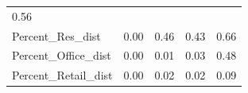 \documentclass[]{article}
\begin{document}
\begin{longtable}[]{@{}lllll@{}}
\begin{minipage}[t]{0.11\columnwidth}
0.56\strut
\end{minipage}\tabularnewline
\begin{minipage}[t]{0.49\columnwidth}\raggedright\strut
Percent\_Res\_dist\strut
\end{minipage} & \begin{minipage}[t]{0.08\columnwidth}\raggedright\strut
0.00\strut
\end{minipage} & \begin{minipage}[t]{0.09\columnwidth}\raggedright\strut
0.46\strut
\end{minipage} & \begin{minipage}[t]{0.09\columnwidth}\raggedright\strut
0.43\strut
\end{minipage} & \begin{minipage}[t]{0.11\columnwidth}\raggedright\strut
0.66\strut
\end{minipage}\tabularnewline
\begin{minipage}[t]{0.49\columnwidth}\raggedright\strut
Percent\_Office\_dist\strut
\end{minipage} & \begin{minipage}[t]{0.08\columnwidth}\raggedright\strut
0.00\strut
\end{minipage} & \begin{minipage}[t]{0.09\columnwidth}\raggedright\strut
0.01\strut
\end{minipage} & \begin{minipage}[t]{0.09\columnwidth}\raggedright\strut
0.03\strut
\end{minipage} & \begin{minipage}[t]{0.11\columnwidth}\raggedright\strut
0.48\strut
\end{minipage}\tabularnewline
\begin{minipage}[t]{0.49\columnwidth}\raggedright\strut
Percent\_Retail\_dist\strut
\end{minipage} & \begin{minipage}[t]{0.08\columnwidth}\raggedright\strut
0.00\strut
\end{minipage} & \begin{minipage}[t]{0.09\columnwidth}\raggedright\strut
0.02\strut
\end{minipage} & \begin{minipage}[t]{0.09\columnwidth}\raggedright\strut
0.02\strut
\end{minipage} & \begin{minipage}[t]{0.11\columnwidth}\raggedright\strut
0.09\strut
\end{minipage}\tabularnewline

\end{longtable}
\end{document}
